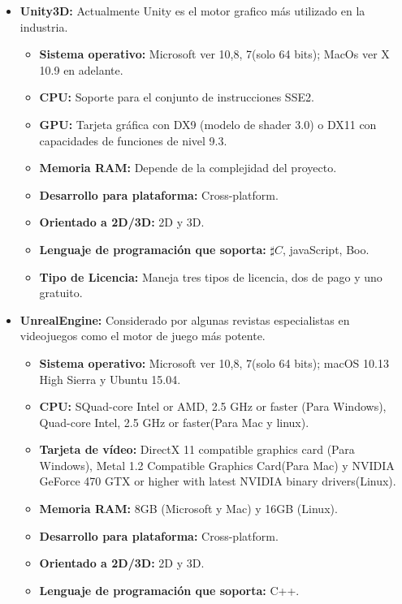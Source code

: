 	\begin{itemize}
		\item \textbf{Unity3D:} Actualmente Unity es el motor grafico más utilizado en la industria. 
			\begin{itemize}
				\item \textbf{Sistema operativo:} Microsoft ver 10,8, 7(solo 64 bits); MacOs ver X 10.9 en adelante.
				\item \textbf{CPU:} Soporte para el conjunto de instrucciones SSE2.
				\item \textbf{GPU:} Tarjeta gráfica con DX9 (modelo de shader 3.0) o DX11 con capacidades de funciones de nivel 9.3.
				\item \textbf{Memoria RAM:} Depende de la complejidad del proyecto.
				\item \textbf{Desarrollo para plataforma:} Cross-platform.
				\item \textbf{Orientado a 2D/3D:} 2D y 3D.
				\item \textbf{Lenguaje de programación que soporta:} $\sharp C$, javaScript, Boo.
				\item \textbf{Tipo de Licencia:} Maneja tres tipos de licencia, dos de pago y uno gratuito. \cite{Ref:Unity} 
			\end{itemize}		
		\item \textbf{UnrealEngine:} Considerado por algunas revistas especialistas en videojuegos como el motor de juego más potente. 
			\begin{itemize}
				\item \textbf{Sistema operativo:} Microsoft ver 10,8, 7(solo 64 bits); macOS 10.13 High Sierra y Ubuntu 15.04.
				\item \textbf{CPU:} SQuad-core Intel or AMD, 2.5 GHz or faster (Para Windows), Quad-core Intel, 2.5 GHz or faster(Para Mac y linux).
				\item \textbf{Tarjeta de vídeo:} DirectX 11 compatible graphics card (Para Windows), Metal 1.2 Compatible Graphics Card(Para Mac) y NVIDIA GeForce 470 GTX or higher with latest NVIDIA binary drivers(Linux). 
				\item \textbf{Memoria RAM:} 8GB (Microsoft y Mac) y 16GB (Linux).
				\item \textbf{Desarrollo para plataforma:} Cross-platform.
				\item \textbf{Orientado a 2D/3D:} 2D y 3D.
				\item \textbf{Lenguaje de programación que soporta:} C++.

\end{itemize}
\end{itemize}
